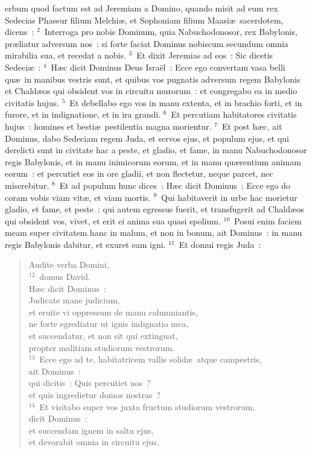 \bchapter
{}erbum quod factum est ad Jeremiam a Domino, quando misit ad eum rex Sedecias Phassur filium Melchi\ae , et Sophoniam filium Maasi\ae\ sacerdotem, dicens~:
${}^{2}$~Interroga pro nobis Dominum, quia Nabuchodonosor, rex Babylonis, pr\ae liatur adversum nos~: si forte faciat Dominus nobiscum secundum omnia mirabilia sua, et recedat a nobis.
${}^{3}$~Et dixit Jeremias ad eos~: Sic dicetis Sedeci\ae~:
${}^{4}$~H\ae c dicit Dominus Deus Isra\"el~: Ecce ego convertam vasa belli qu\ae\ in manibus vestris sunt, et quibus vos pugnatis adversum regem Babylonis et Chald\ae os qui obsident vos in circuitu murorum~: et congregabo ea in medio civitatis hujus.
${}^{5}$~Et debellabo ego vos in manu extenta, et in brachio forti, et in furore, et in indignatione, et in ira grandi.
${}^{6}$~Et percutiam habitatores civitatis hujus~: homines et besti\ae\ pestilentia magna morientur.
${}^{7}$~Et post h\ae c, ait Dominus, dabo Sedeciam regem Juda, et servos ejus, et populum ejus, et qui derelicti sunt in civitate hac a peste, et gladio, et fame, in manu Nabuchodonosor regis Babylonis, et in manu inimicorum eorum, et in manu qu\ae rentium animam eorum~: et percutiet eos in ore gladii, et non flectetur, neque parcet, nec miserebitur.
${}^{8}$~Et ad populum hunc dices~: H\ae c dicit Dominus~: Ecce ego do coram vobis viam vit\ae , et viam mortis.
${}^{9}$~Qui habitaverit in urbe hac morietur gladio, et fame, et peste~: qui autem egressus fuerit, et transfugerit ad Chald\ae os qui obsident vos, vivet, et erit ei anima sua quasi spolium.
${}^{10}$~Posui enim faciem meam super civitatem hanc in malum, et non in bonum, ait Dominus~: in manu regis Babylonis dabitur, et exuret eam igni.
${}^{11}$~Et domui regis Juda~: \begin{flushleft}\begin{verse}Audite verba Domini,\\
${}^{12}$~domus David.\\ H\ae c dicit Dominus~:\\ Judicate mane judicium,\\ et eruite vi oppressum de manu calumniantis,\\ ne forte egrediatur ut ignis indignatio mea,\\ et succendatur, et non sit qui extinguat,\\ propter malitiam studiorum vestrorum.\\
${}^{13}$~Ecce ego ad te, habitatricem vallis solid\ae\ atque campestris,\\ ait Dominus~:\\ qui dicitis~: Quis percutiet nos~?\\ et quis ingredietur domos nostras~?\\
${}^{14}$~Et visitabo super vos juxta fructum studiorum vestrorum,\\ dicit Dominus~:\\ et succendam ignem in saltu ejus,\\ et devorabit omnia in circuitu ejus.\end{verse}\end{flushleft}



